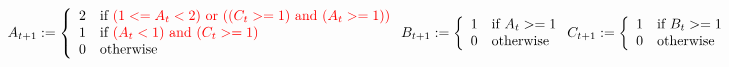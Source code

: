 \begin{center}




$
\begin{array}{l}

A_{t+1} :=\left\{ \begin{array}{cl}
      2 & \mbox{if \hl{$(1 <= A_t < 2)$ or $((C_t >= 1)$ and $(A_t >= 1))$}} \\
      1 & \mbox{if \hl{ $(A_t < 1)$ and $(C_t >= 1)$}} \\
      0 & \mbox{otherwise}  \\
     \end{array}
\right.
B_{t+1} :=\left\{ \begin{array}{cl}
      1 & \mbox{if $A_t >= 1$} \\
      0 & \mbox{otherwise}  \\
     \end{array}
\right.
C_{t+1} :=\left\{ \begin{array}{cl}
      1 & \mbox{if $B_t >= 1$} \\
      0 & \mbox{otherwise}  \\
     \end{array}
\right.
\end{array}
$

\end{center}

